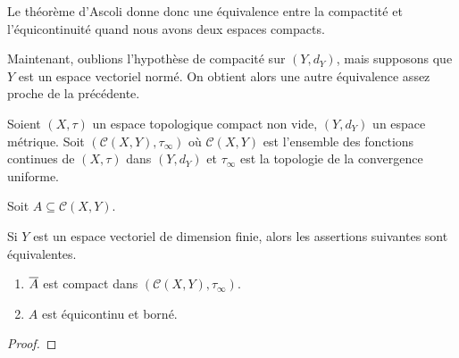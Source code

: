 Le théorème d'Ascoli donne donc une équivalence entre la compactité et
l'équicontinuité quand nous avons deux espaces compacts.

Maintenant, oublions l'hypothèse de compacité sur $(Y, d_{Y})$, mais supposons
que $Y$ est un espace vectoriel normé. On obtient alors une autre équivalence
assez proche de la précédente.

\begin{corollary}
	Soient $(X, \tau)$ un espace topologique compact non vide, $(Y, d_{Y})$ un
	espace métrique. Soit $(\mathcal{C}(X, Y), \tau_{\infty})$ où
	$\mathcal{C}(X, Y)$ est l'ensemble des fonctions continues de $(X, \tau)$
	dans $(Y, d_{Y})$ et $\tau_{\infty}$ est la topologie de la convergence uniforme.

	Soit $A \subseteq \mathcal{C}(X, Y)$.

	Si $Y$ est un espace vectoriel de dimension finie, alors les assertions suivantes sont
	équivalentes.

	\begin{enumerate}
		\item $\overline{A}$ est compact dans $(\mathcal{C}(X, Y), \tau_{\infty})$.
		\item $A$ est équicontinu et borné.
	\end{enumerate}
\end{corollary}

\ifdefined\outputproof
\begin{proof}

\end{proof}
\fi
